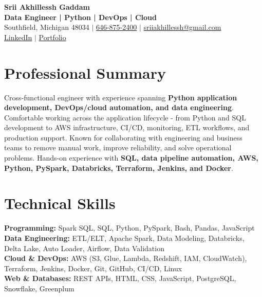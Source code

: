\documentclass[letterpaper,10pt]{article}
\begin{document}
\fontsize{9.35pt}{10.45pt}\selectfont

\begin{center}
    {\LARGE \textbf{Srii Akhillessh Gaddam}} \\[-1pt]
    \textbf{Data Engineer | Python | DevOps | Cloud} \\[2pt]
    Southfield, Michigan 48034 $|$
    \href{tel:6468752400}{646-875-2400} $|$
    \href{mailto:sriiakhillessh@gmail.com}{sriiakhillessh@gmail.com} \\[1pt]
    \href{https://www.linkedin.com/in/srii-akhiilessh-gaddam-b48668191/}{LinkedIn} $|$
    \href{https://sriiakhillesshg.github.io/portfolio/}{Portfolio}
\end{center}
\vspace{-8pt}

\section{Professional Summary}
\small{Cross-functional engineer with experience spanning \textbf{Python application development, DevOps/cloud automation, and data engineering}. Comfortable working across the application lifecycle - from Python and SQL development to AWS infrastructure, CI/CD, monitoring, ETL workflows, and production support. Known for collaborating with engineering and business teams to remove manual work, improve reliability, and solve operational problems. Hands-on experience with \textbf{SQL, data pipeline automation, AWS, Python, PySpark, Databricks, Terraform, Jenkins, and Docker}.}

\section{Technical Skills}
\small{
\textbf{Programming:} Spark SQL, SQL, Python, PySpark, Bash, Pandas, JavaScript \\
\textbf{Data Engineering:} ETL/ELT, Apache Spark, Data Modeling, Databricks, Delta Lake, Auto Loader, Airflow, Data Validation \\
\textbf{Cloud \& DevOps:} AWS (S3, Glue, Lambda, Redshift, IAM, CloudWatch), Terraform, Jenkins, Docker, Git, GitHub, CI/CD, Linux \\
\textbf{Web \& Databases:} REST APIs, HTML, CSS, JavaScript, PostgreSQL, Snowflake, Greenplum
}

\end{document}
